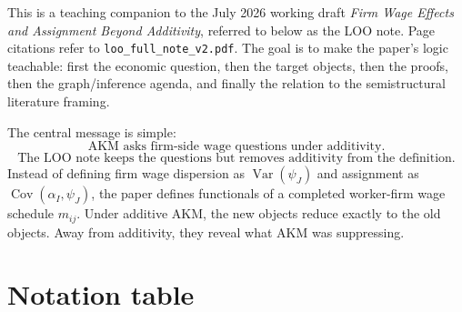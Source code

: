 \documentclass[11pt]{article}
\newcommand{\Var}{\operatorname{Var}}
\newcommand{\Cov}{\operatorname{Cov}}
\begin{document}
This is a teaching companion to the July 2026 working draft
\emph{Firm Wage Effects and Assignment Beyond Additivity}, referred to below as
the LOO note. Page citations refer to \texttt{loo\_full\_note\_v2.pdf}. The
goal is to make the paper's logic teachable: first the economic question, then
the target objects, then the proofs, then the graph/inference agenda, and
finally the relation to the semistructural literature framing.

The central message is simple:
\[
\text{AKM asks firm-side wage questions under additivity.}
\]
\[
\text{The LOO note keeps the questions but removes additivity from the definition.}
\]
Instead of defining firm wage dispersion as \(\Var(\psi_J)\) and assignment as
\(\Cov(\alpha_I,\psi_J)\), the paper defines functionals of a completed
worker-firm wage schedule \(m_{ij}\). Under additive AKM, the new objects reduce
exactly to the old objects. Away from additivity, they reveal what AKM was
suppressing.

\section{Notation table}
\end{document}
